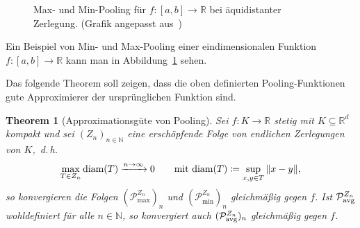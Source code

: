 \documentclass[paper=a4, 	%
		fontsize=11pt,
		abstract=true, 	%
		headsepline, 	%
		notitlepage	%
		]{scrartcl}
\newtheorem{theorem}{Theorem}[section]
\theoremstyle{definition}
\newcommand{\R}{\mathbb{R}}
\newcommand{\N}{\mathbb{N}}
\newcommand{\norm}[1]{\left\lVert#1\right\rVert}
\newcommand{\avg}{\textnormal{avg}}
\newcommand{\diam}{\textnormal{diam}}
\begin{document}
\begin{figure}
    \centering
    
    \caption{Max- und Min-Pooling für $f:[a,b]\rightarrow\R$ bei äquidistanter Zerlegung.
    {\scriptsize (Grafik angepasst aus~\cite{Calin2020})}}
    \label{fig:equidistant-pooling}
\end{figure}

Ein Beispiel von Min- und Max-Pooling einer eindimensionalen Funktion $f:[a,b]\rightarrow \R$ kann man in Abbildung~\ref{fig:equidistant-pooling} sehen.

Das folgende Theorem soll zeigen, dass die oben definierten Pooling-Funktionen gute Approximierer der ursprünglichen Funktion sind.

\begin{theorem}[Approximationsgüte von Pooling]
    Sei $f:K \rightarrow \R$ stetig mit $K\subseteq \R^d$ kompakt und sei $(Z_n)_{n\in\N}$ eine erschöpfende Folge von endlichen Zerlegungen von $K$,~d.\,h. 
    \[
        \max_{T\in Z_n} \diam(T) \xrightarrow{n\rightarrow\infty} 0 \qquad \text{mit $\diam(T)\coloneqq \sup_{x,y\in T} \norm{x - y}$},
    \]
    so konvergieren die Folgen $(\mathcal{P}^{Z_n}_{\max})_n$ und $(\mathcal{P}^{Z_n}_{\min})_n$ gleichmäßig gegen $f$.
    Ist $\mathcal{P}^{Z_n}_{\avg}$ wohldefiniert für alle $n\in\N$, so konvergiert auch $(\mathcal{P}^{Z_n}_{\avg})_n$ gleichmäßig gegen $f$.
\end{theorem}
\end{document}
